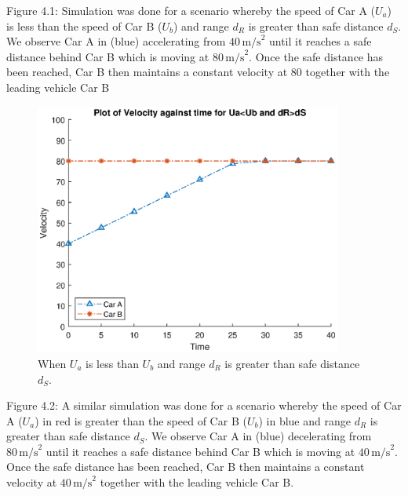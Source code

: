 \documentclass[12pt]{report}
\begin{document}
Figure 4.1: Simulation was done for a scenario whereby the speed of Car A ($U_a$) is less than the speed of Car B ($U_b$) and range $d_R$ is greater than safe distance $d_S$.
We observe Car A in (blue) accelerating from $40\,\text{m/s}^2$ until it reaches a safe distance behind Car B which is moving at $80\,\text{m/s}^2$. Once the safe distance has been reached, Car B then maintains a constant velocity at 80 together with the leading vehicle Car B

\begin{figure}[!ht]
	\includegraphics[width=0.9\textwidth]{acceleration.eps}
	\caption{When $U_a$ is less than $U_b$ and range $d_R$ is greater than safe distance $d_S$.}
	\label{fig}
\end{figure}

Figure 4.2: A similar simulation was done for a scenario whereby the speed of Car A ($U_a$) in red is greater than the speed of Car B ($U_b$) in blue and range $d_R$ is greater than safe distance $d_S$.
We observe Car A in (blue) decelerating from  $80\,\text{m/s}^2$ until it reaches a safe distance behind Car B which is moving at $40\,\text{m/s}^2$. Once the safe distance has been reached, Car B then maintains a constant velocity at $40\,\text{m/s}^2$ together with the leading vehicle Car B.
\end{document}
